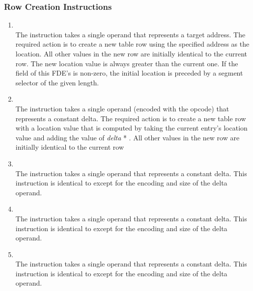 \subsubsection{Row Creation Instructions}
\label{chap:rowcreationinstructions}
\begin{enumerate}[1. ]

\item \textbf{\DWCFAsetlocTARG} \\
The \DWCFAsetlocNAME{} instruction 
takes a single operand that
represents a target address. The required action is to create a
new table row using the specified address as the location. All
other values in the new row are initially identical to the
current row. The new location value is always greater than
the current one. 
If the \HFNsegmentselectorsize{} field of this FDE's 
is non-zero, the initial location is preceded by a segment
selector of the given length.

\item \textbf{\DWCFAadvancelocTARG} \\
The \DWCFAadvancelocNAME{} instruction takes a single operand (encoded
with the opcode) that represents a constant delta. The required
action is to create a new table row with a location value that
is computed by taking the current entry\textquoteright s location value
and adding the value of 
\textit{delta} * . 
All other values in the new row are initially identical to the
current row

\item \textbf{\DWCFAadvanceloconeTARG{}} \\
The \DWCFAadvanceloconeNAME{} instruction takes a single \HFTubyte{}
operand that represents a constant delta. This instruction
is identical to \DWCFAadvanceloc{} except for the encoding
and size of the delta operand.

\item \textbf{\DWCFAadvanceloctwoTARG} \\
The \DWCFAadvanceloctwoNAME{} instruction takes a single \HFTuhalf{}
operand that represents a constant delta. This instruction
is identical to \DWCFAadvanceloc{} except for the encoding
and size of the delta operand.

\item \textbf{\DWCFAadvancelocfourTARG} \\
The \DWCFAadvancelocfourNAME{} instruction takes a single \HFTuword{}
operand that represents a constant delta. This instruction
is identical to \DWCFAadvanceloc{} except for the encoding
and size of the delta operand.

\end{enumerate}


